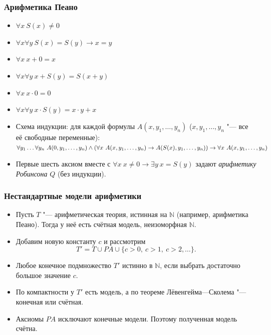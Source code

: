 \documentclass[10pt]{beamer}
\begin{document}
\begin{frame}
    \frametitle{Арифметика Пеано}
    \begin{itemize}
        \item $\forall x ~ S(x) \neq 0$
        \item $\forall x \forall y ~ S(x) = S(y) \to x = y$
        \item $\forall x ~ x + 0 = x$
        \item $\forall x \forall y ~ x + S(y) = S(x+y)$
        \item $\forall x ~ x \cdot 0 = 0$
        \item $\forall x \forall y ~ x \cdot S(y) = x \cdot y + x$
        \item Схема индукции: для каждой формулы $A(x,y_1,\ldots,y_n)$ ($x,y_1,\ldots,y_n$ "--- все её свободные переменные): \\
        $\forall y_1 \ldots \forall y_n ~ A(0,y_1,\ldots,y_n) \land \linebreak (\forall x ~ A(x,y_1,\ldots,y_n) \to A(S(x),y_1,\ldots,y_n)) \to \linebreak \forall x ~ A(x,y_1,\ldots,y_n)$
        \pause
        \item Первые шесть аксиом вместе с $\forall x~x\ne0\to\exists y~x=S(y)$ задают \emph{арифметику Робинсона} $Q$ (без индукции).
    \end{itemize}
\end{frame}

\begin{frame}
    \frametitle{Нестандартные модели арифметики}
    \begin{itemize}
        \item Пусть $T$ "--- арифметическая теория, истинная на $\mathbb{N}$ (например, арифметика Пеано). Тогда у неё есть счётная модель, неизоморфная $\mathbb{N}$.
        \item Добавим новую константу $c$ и рассмотрим
        \[
            T'=T\cup\mathit{PA}\cup\{c>0,\ c>1,\ c>2,\ldots\}.
        \]
        \pause
        \item Любое конечное подмножество $T'$ истинно в $\mathbb{N}$, если выбрать достаточно большое значение $c$.
        \item По компактности у $T'$ есть модель, а по теореме Лёвенгейма---Сколема "--- конечная или счётная.
        \item Аксиомы $\mathit{PA}$ исключают конечные модели. Поэтому полученная модель счётна.
    \end{itemize}
\end{frame}
\end{document}
